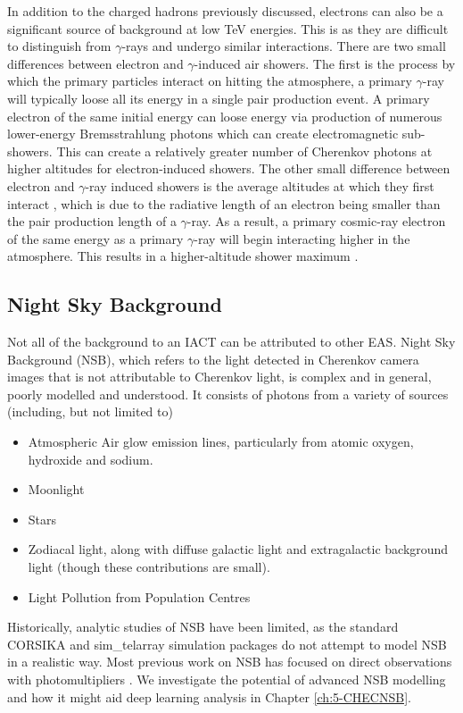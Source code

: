 In addition to the charged hadrons previously discussed, electrons can also be a significant source of background at low TeV energies. This is as they are difficult to distinguish from $\gamma$-rays and undergo similar interactions. There are two small differences between electron and $\gamma$-induced air showers. The first is the process by which the primary particles interact on hitting the atmosphere, a primary $\gamma$-ray will typically loose all its energy in a single pair production event. A primary electron of the same initial energy can loose energy via production of numerous lower-energy Bremsstrahlung photons which can create electromagnetic sub-showers. This can create a relatively greater number of Cherenkov photons at higher altitudes for electron-induced showers. The other small difference between electron and $\gamma$-ray induced showers is the average altitudes at which they first interact \cite{Sitarek1i}, which is due to the radiative length of an electron being smaller than the pair production length of a $\gamma$-ray. As a result, a primary cosmic-ray electron of the same energy as a primary $\gamma$-ray will begin interacting higher in the atmosphere. This results in a higher-altitude shower maximum \cite{lypova}. 

\subsection{Night Sky Background}
Not all of the background to an IACT can be attributed to other EAS. Night Sky Background (NSB), which refers to the light detected in Cherenkov camera images that is not attributable to Cherenkov light, is complex and in general, poorly modelled and understood. It consists of photons from a variety of sources (including, but not limited to)

\begin{itemize}
    \item Atmospheric Air glow emission lines, particularly from atomic oxygen, hydroxide and sodium.
    \item Moonlight
    \item Stars
    \item Zodiacal light, along with diffuse galactic light and extragalactic background light (though these contributions are small). \cite{nsbref}
    \item Light Pollution from Population Centres
\end{itemize}

Historically, analytic studies of NSB have been limited, as the standard CORSIKA and sim\_telarray simulation packages do not attempt to model NSB in a realistic way. Most previous work on NSB has focused on direct observations with photomultipliers \cite{BandE}. We investigate the potential of advanced NSB modelling and how it might aid deep learning analysis in Chapter \ref{ch:5-CHECNSB}.

